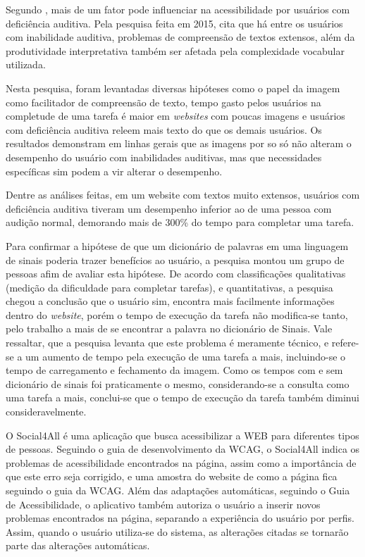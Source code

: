 \documentclass[
	12pt,				%
	oneside,			%
	a4paper,			%
	english,			%
	brazil				%
	]{abntex2ppgsi}
\begin{document}
Segundo , mais de um fator pode influenciar na acessibilidade por usuários com deficiência auditiva. Pela pesquisa feita em 2015,  cita que há entre os usuários com inabilidade auditiva, problemas de compreensão de textos extensos, além da produtividade interpretativa também ser afetada pela complexidade vocabular utilizada. 

Nesta pesquisa, foram levantadas diversas hipóteses como o papel da imagem como facilitador de compreensão de texto, tempo gasto pelos usuários na completude de uma tarefa é maior em \textit{websites} com poucas imagens e usuários com deficiência auditiva releem mais texto do que os demais usuários. Os resultados demonstram em linhas gerais que as imagens por so só não alteram o desempenho do usuário com inabilidades auditivas, mas que necessidades específicas sim podem a vir alterar o desempenho.

Dentre as análises feitas, em um website com textos muito extensos, usuários com deficiência auditiva tiveram um desempenho inferior ao de uma pessoa com audição normal, demorando mais de 300\% do tempo para completar uma tarefa. 

Para confirmar a hipótese de que um dicionário de palavras em uma linguagem de sinais poderia trazer benefícios ao usuário, a pesquisa montou um grupo de pessoas afim de avaliar esta hipótese. De acordo com classificações qualitativas (medição da dificuldade para completar tarefas), e quantitativas, a pesquisa chegou a conclusão que o usuário sim, encontra mais facilmente informações dentro do \textit{website}, porém o tempo de execução da tarefa não modifica-se tanto, pelo trabalho a mais de se encontrar a palavra no dicionário de Sinais. Vale ressaltar, que a pesquisa levanta que este problema é meramente técnico, e refere-se a um aumento de tempo pela execução de uma tarefa a mais, incluindo-se o tempo de carregamento e fechamento da imagem. Como os tempos com e sem dicionário de sinais foi praticamente o mesmo, considerando-se a consulta como uma tarefa a mais, conclui-se que o tempo de execução da tarefa também diminui consideravelmente.


O Social4All \cite{socialAll} é uma aplicação que busca acessibilizar a WEB para diferentes tipos de pessoas. Seguindo o guia de desenvolvimento da WCAG, o Social4All indica os problemas de acessibilidade encontrados na página, assim como a importância de que este erro seja corrigido, e uma amostra do website de como a página fica seguindo o guia da WCAG. Além das adaptações automáticas, seguindo o Guia de Acessibilidade, o aplicativo também autoriza o usuário a inserir novos problemas encontrados na página, separando a experiência do usuário por perfis. Assim, quando o usuário utiliza-se do sistema, as alterações citadas se tornarão parte das alterações automáticas.
\end{document}
